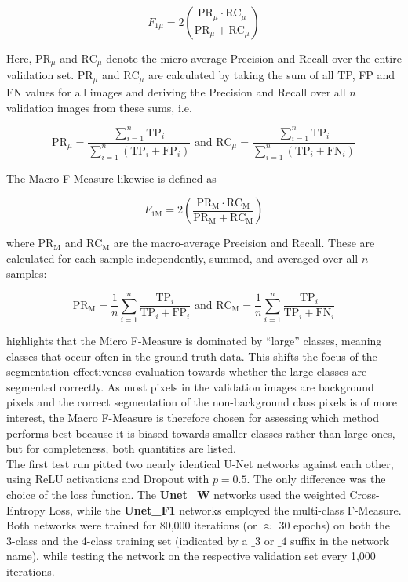 \[ F_{1\mu} = 2 \left ( \frac{\text{PR}_\mu \cdot \text{RC}_\mu}{\text{PR}_\mu + \text{RC}_\mu} \right ) \]

\noindent Here, $\text{PR}_\mu$ and $\text{RC}_\mu$ denote the micro-average Precision and Recall over the entire validation set. $\text{PR}_\mu$ and $\text{RC}_\mu$ are calculated by taking the sum of all TP, FP and FN values for all images and deriving the Precision and Recall over all $n$ validation images from these sums, i.e.

\[ \text{PR}_\mu = \frac{\sum_{i=1}^{n}\text{TP}_i}{\sum_{i=1}^{n} (\text{TP}_i + \text{FP}_i)} \text{ and }  \text{RC}_\mu = \frac{\sum_{i=1}^{n} \text{TP}_i}{\sum_{i=1}^{n} (\text{TP}_i + \text{FN}_i)} \]

\noindent The Macro F-Measure likewise is defined as

\[ F_{\text{1M}} = 2 \left ( \frac{\text{PR}_\text{M} \cdot \text{RC}_\text{M}}{\text{PR}_\text{M} + \text{RC}_\text{M}} \right ) \]

\noindent where $\text{PR}_\text{M}$ and $\text{RC}_\text{M}$ are the macro-average Precision and Recall. These are calculated for each sample independently, summed, and averaged over all $n$ samples:

\[ \text{PR}_\text{M} = \frac{1}{n} \sum_{i=1}^{n} \frac{\text{TP}_i}{\text{TP}_i + \text{FP}_i} \text { and } \text{RC}_\text{M} = \frac{1}{n} \sum_{i=1}^{n} \frac{\text{TP}_i}{\text{TP}_i + \text{FN}_i} \] 

\noindent \cite[pp. 317-318]{information_retrieval} highlights that the Micro F-Measure is dominated by ``large'' classes, meaning classes that occur often in the ground truth data. This shifts the focus of the segmentation effectiveness evaluation towards whether the large classes are segmented correctly. As most pixels in the validation images are background pixels and the correct segmentation of the non-background class pixels is of more interest, the Macro F-Measure is therefore chosen for assessing which method performs best because it is biased towards smaller classes rather than large ones, but for completeness, both quantities are listed.\\

\noindent The first test run pitted two nearly identical U-Net networks against each other, using ReLU activations and Dropout with $p = 0.5$. The only difference was the choice of the loss function. The \textbf{Unet\_W} networks used the weighted Cross-Entropy Loss, while the \textbf{Unet\_F1} networks employed the multi-class F-Measure. Both networks were trained for 80,000 iterations (or $\approx$ 30 epochs) on both the 3-class and the 4-class training set (indicated by a $\_3$ or $\_4$ suffix in the network name), while testing the network on the respective validation set every 1,000 iterations.

